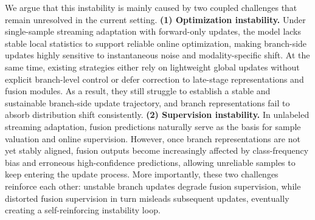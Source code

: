We argue that this instability is mainly caused by two coupled challenges that remain unresolved in the current setting. \textbf{(1) Optimization instability.} Under single-sample streaming adaptation with forward-only updates, the model lacks stable local statistics to support reliable online optimization, making branch-side updates highly sensitive to instantaneous noise and modality-specific shift. At the same time, existing strategies either rely on lightweight global updates without explicit branch-level control or defer correction to late-stage representations and fusion modules. As a result, they still struggle to establish a stable and sustainable branch-side update trajectory, and branch representations fail to absorb distribution shift consistently. \textbf{(2) Supervision instability.} In unlabeled streaming adaptation, fusion predictions naturally serve as the basis for sample valuation and online supervision. However, once branch representations are not yet stably aligned, fusion outputs become increasingly affected by class-frequency bias and erroneous high-confidence predictions, allowing unreliable samples to keep entering the update process. More importantly, these two challenges reinforce each other: unstable branch updates degrade fusion supervision, while distorted fusion supervision in turn misleads subsequent updates, eventually creating a self-reinforcing instability loop.

